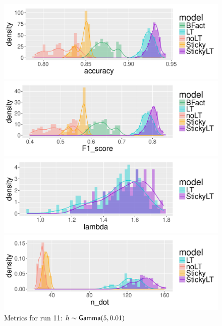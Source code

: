 \begin{figure}[tb]
  \centering
  \begin{minipage}{0.75\textwidth}
  \includegraphics[width = \textwidth]{fig/cocktail/synth_s16_m12/hyper_h/h10.0_nocs_cp0/a5b0p01/accuracy_density.pdf}
\end{minipage}

\begin{minipage}{0.75\textwidth}
  \includegraphics[width = \textwidth]{fig/cocktail/synth_s16_m12/hyper_h/h10.0_nocs_cp0/a5b0p01/F1_score_density.pdf}
\end{minipage}

\begin{minipage}{0.75\textwidth}
  \includegraphics[width = \textwidth]{fig/cocktail/synth_s16_m12/hyper_h/h10.0_nocs_cp0/a5b0p01/lambda_density.pdf}
\end{minipage}

\begin{minipage}{0.75\textwidth}
  \includegraphics[width = \textwidth]{fig/cocktail/synth_s16_m12/hyper_h/h10.0_nocs_cp0/a5b0p01/n_dot_density.pdf}
\end{minipage}
\caption{Metrics for run 11: $h \sim \mathsf{Gamma}(5,0.01)$}
\end{figure}

